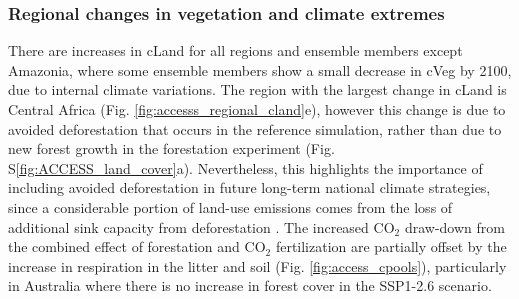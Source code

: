 \documentclass[]{article}
\begin{document}

\subsubsection{Regional changes in vegetation and climate extremes}

There are increases in cLand for all regions and ensemble members except Amazonia, where some ensemble members show a small decrease in cVeg by 2100, due to internal climate variations.
The region with the largest change in cLand is Central Africa (Fig. \ref{fig:accesss_regional_cland}e), however this change is due to avoided deforestation that occurs in the reference simulation, rather than due to new forest growth in the forestation experiment (Fig. S\ref{fig:ACCESS_land_cover}a).
Nevertheless, this highlights the importance of including avoided deforestation in future long-term national climate strategies, since a considerable portion of land-use emissions comes from the loss of additional sink capacity from deforestation \parencite{gitz_amplifying_2003, pongratz_terminology_2014, obermeier_modelled_2021}.
The increased CO$_2$ draw-down from the combined effect of forestation and CO$_2$ fertilization are partially offset by the increase in respiration in the litter and soil (Fig. \ref{fig:access_cpools}), particularly in Australia where there is no increase in forest cover in the SSP1-2.6 scenario.
\end{document}
